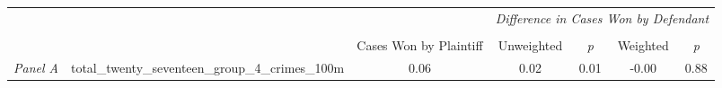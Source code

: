 \begin{tabular}{llccccc}
\toprule
 &  & \textit{} & \multicolumn{4}{c}{\textit{Difference in Cases Won by Defendant}} \\
\cline{4-7}
\\
 &  & Cases Won by Plaintiff & Unweighted & \emph{p} & Weighted & \emph{p} \\
\midrule
\textit{Panel A} & total_twenty_seventeen_group_4_crimes_100m & 0.06 & 0.02 & 0.01 & -0.00 & 0.88 \\
\cline{1-7}
\bottomrule
\end{tabular}
